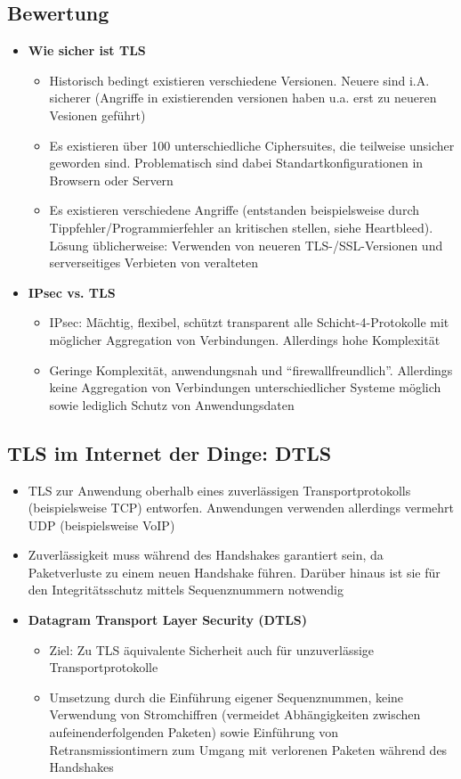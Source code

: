 \subsection{Bewertung}
\begin{itemize}
	\item \textbf{Wie sicher ist TLS}
	\begin{itemize}
		\item Historisch bedingt existieren verschiedene Versionen. Neuere sind i.A. sicherer (Angriffe in existierenden versionen haben u.a. erst zu neueren Vesionen geführt)
		\item Es existieren über 100 unterschiedliche Ciphersuites, die teilweise unsicher geworden sind. Problematisch sind dabei Standartkonfigurationen in Browsern oder Servern
		\item Es existieren verschiedene Angriffe (entstanden beispielsweise durch Tippfehler/Programmierfehler an kritischen stellen, siehe Heartbleed). Lösung üblicherweise: Verwenden von neueren TLS-/SSL-Versionen und serverseitiges Verbieten von veralteten
	\end{itemize}
	\item \textbf{IPsec vs. TLS}
	\begin{itemize}
		\item IPsec: Mächtig, flexibel, schützt transparent alle Schicht-4-Protokolle mit möglicher Aggregation von Verbindungen. Allerdings hohe Komplexität
		\item Geringe Komplexität, anwendungsnah und "`firewallfreundlich"'. Allerdings keine Aggregation von Verbindungen unterschiedlicher Systeme möglich sowie lediglich Schutz von Anwendungsdaten
	\end{itemize}
\end{itemize}


\subsection{TLS im Internet der Dinge: DTLS}
\begin{itemize}
	\item TLS zur Anwendung oberhalb eines zuverlässigen Transportprotokolls (beispielsweise TCP) entworfen. Anwendungen verwenden allerdings vermehrt UDP (beispielsweise VoIP)
	\item Zuverlässigkeit muss während des Handshakes garantiert sein, da Paketverluste zu einem neuen Handshake führen. Darüber hinaus ist sie für den Integritätsschutz mittels Sequenznummern notwendig
	\item \textbf{Datagram Transport Layer Security (DTLS)}
	\begin{itemize}
		\item Ziel: Zu TLS äquivalente Sicherheit auch für unzuverlässige Transportprotokolle
		\item Umsetzung durch die Einführung eigener Sequenznummen, keine Verwendung von Stromchiffren (vermeidet Abhängigkeiten zwischen aufeinenderfolgenden Paketen) sowie Einführung von Retransmissiontimern zum Umgang mit verlorenen Paketen während des Handshakes
	\end{itemize}
\end{itemize}



